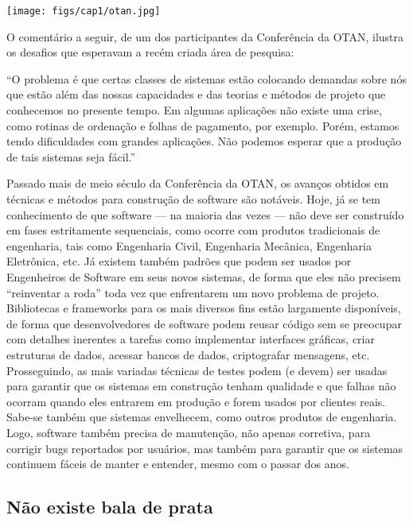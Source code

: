 \documentclass[
  11pt,
  twoside]{book}
\renewenvironment{quote}{\centering \vspace{1.5ex} \begin{tcolorbox}[colback=backcolor, width=4.9in]}{\end{tcolorbox}}
\let\origfigure\figure
\let\endorigfigure\endfigure
\renewenvironment{figure}[1][2] {
    \expandafter\origfigure\expandafter[!h]
} {
    \endorigfigure
}
\begin{document}
\begin{figure}
\centering
\texttt{[image: figs/cap1/otan.jpg]}
\caption{Cientistas na conferência da OTAN de 1968 sobre Engenharia de
Software. Reprodução gentilmente autorizada pelo Prof.~Robert McClure.}
\end{figure}

O comentário a seguir, de um dos participantes da Conferência da OTAN,
ilustra os desafios que esperavam a recém criada área de pesquisa:

\begin{quote}
``O problema é que certas classes de sistemas estão colocando demandas
sobre nós que estão além das nossas capacidades e das teorias e métodos
de projeto que conhecemos no presente tempo. Em algumas aplicações não
existe uma crise, como rotinas de ordenação e folhas de pagamento, por
exemplo. Porém, estamos tendo dificuldades com grandes aplicações. Não
podemos esperar que a produção de tais sistemas seja fácil.''
\end{quote}

Passado mais de meio século da Conferência da OTAN, os avanços obtidos
em técnicas e métodos para construção de software são notáveis. Hoje, já
se tem conhecimento de que software --- na maioria das vezes --- não
deve ser construído em fases estritamente sequenciais, como ocorre com
produtos tradicionais de engenharia, tais como Engenharia Civil,
Engenharia Mecânica, Engenharia Eletrônica, etc. Já existem também
padrões que podem ser usados por Engenheiros de Software em seus novos
sistemas, de forma que eles não precisem ``reinventar a roda'' toda vez
que enfrentarem um novo problema de projeto. Bibliotecas e frameworks
para os mais diversos fins estão largamente disponíveis, de forma que
desenvolvedores de software podem reusar código sem se preocupar com
detalhes inerentes a tarefas como implementar interfaces gráficas, criar
estruturas de dados, acessar bancos de dados, criptografar mensagens,
etc. Prosseguindo, as mais variadas técnicas de testes podem (e devem)
ser usadas para garantir que os sistemas em construção tenham qualidade
e que falhas não ocorram quando eles entrarem em produção e forem usados
por clientes reais. Sabe-se também que sistemas envelhecem, como outros
produtos de engenharia. Logo, software também precisa de manutenção, não
apenas corretiva, para corrigir bugs reportados por usuários, mas também
para garantir que os sistemas continuem fáceis de manter e entender,
mesmo com o passar dos anos.

\hypertarget{nuxe3o-existe-bala-de-prata}{%
\subsection*{Não existe bala de
prata}\label{nuxe3o-existe-bala-de-prata}}
\end{document}
